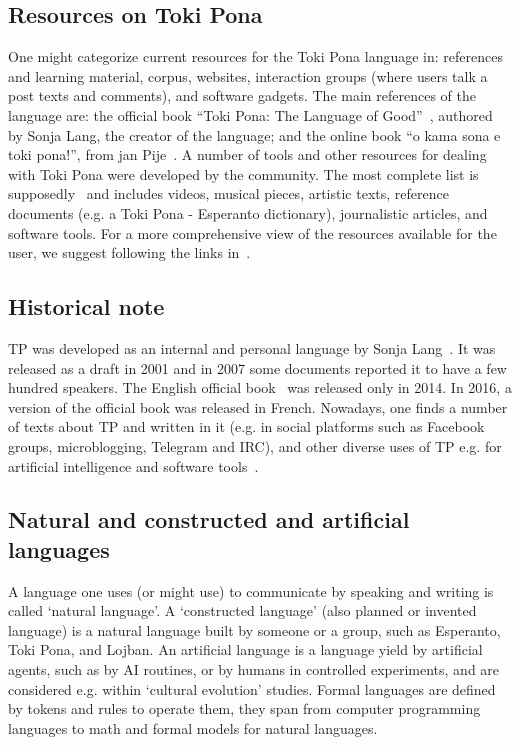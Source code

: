 \subsection{Resources on Toki Pona}
One might categorize current resources for the Toki Pona
language in: references and learning material, corpus,
websites, interaction groups
(where users talk a post texts and comments), and software gadgets.
The main references of the language are:
  the official book ``Toki Pona: The Language of Good''~\cite{tpLang},
    authored by Sonja Lang, the creator of the language;
and the online book ``o kama sona e toki pona!'',
from jan Pije~\cite{kama}.
A number of tools and other resources for dealing with Toki Pona
were developed by the community.
The most complete list is supposedly~\cite{gdoc} and includes
videos, musical pieces, artistic texts, reference documents (e.g.
a Toki Pona - Esperanto dictionary), journalistic articles,
and software tools.
For a more comprehensive view of the resources available
for the user, we suggest following the links 
in~\cite{gdoc,wikiToki}.

\subsection{Historical note}
TP was developed as an internal and personal language
by Sonja Lang~\cite{interview}.
It was released as a draft in 2001 and in 2007 some documents
reported it to have a few hundred speakers.
The English official book~\cite{tpLang} was released only in 2014.
In 2016, a version of the official book was released in French.
Nowadays, one finds a number of texts about TP and written
in it
(e.g. in social platforms such as Facebook groups,
microblogging, Telegram and
IRC), and other diverse uses of TP e.g. for artificial intelligence and software tools~\cite{gdoc}. 

\subsection{Natural and constructed and artificial languages}
A language one uses (or might use) to communicate by speaking
and writing is called `natural language'.
A `constructed language' (also planned or invented language) is a natural language built by someone or
a group, such as Esperanto, Toki Pona, and Lojban.
An artificial language is a language yield by artificial agents,
such as by AI routines, or by humans in controlled experiments,
and are considered e.g. within `cultural evolution' studies.
Formal languages are defined by tokens and rules to
operate them, they span from computer programming languages
to math and formal models for natural languages.


